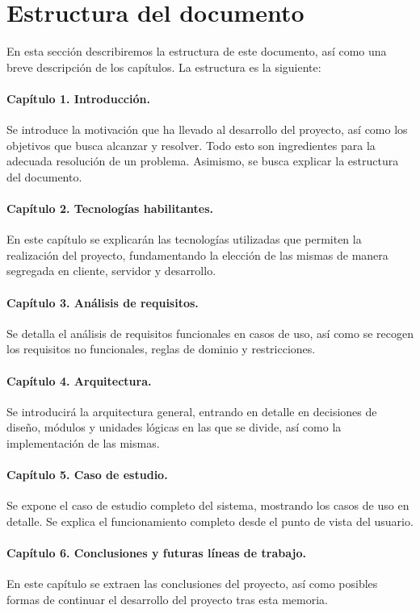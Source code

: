 \section{Estructura del documento}
\label{sec:structure-of-document}

En esta sección describiremos la estructura de este documento, así como una breve descripción de los capítulos. La estructura es la siguiente:

\paragraph{Capítulo 1. Introducción.}

Se introduce la motivación que ha llevado al desarrollo del proyecto, así como los objetivos que busca alcanzar y resolver. Todo esto son ingredientes para la adecuada resolución de un problema. Asimismo, se busca explicar la estructura del documento.

\paragraph{Capítulo 2. Tecnologías habilitantes.}

En este capítulo se explicarán las tecnologías utilizadas que permiten la realización del proyecto, fundamentando la elección de las mismas de manera segregada en cliente, servidor y desarrollo.

\paragraph{Capítulo 3. Análisis de requisitos.}

Se detalla el análisis de requisitos funcionales en casos de uso, así como se recogen los requisitos no funcionales, reglas de dominio y restricciones.

\paragraph{Capítulo 4. Arquitectura.}

Se introducirá la arquitectura general, entrando en detalle en decisiones de diseño, módulos y unidades lógicas en las que se divide, así como la  implementación de las mismas.

\paragraph{Capítulo 5. Caso de estudio.}

Se expone el caso de estudio completo del sistema, mostrando los casos de uso en detalle. Se explica el funcionamiento completo desde el punto de vista del usuario.

\paragraph{Capítulo 6. Conclusiones y futuras líneas de trabajo.}

En este capítulo se extraen las conclusiones del proyecto, así como posibles formas de continuar el desarrollo del proyecto tras esta memoria.
